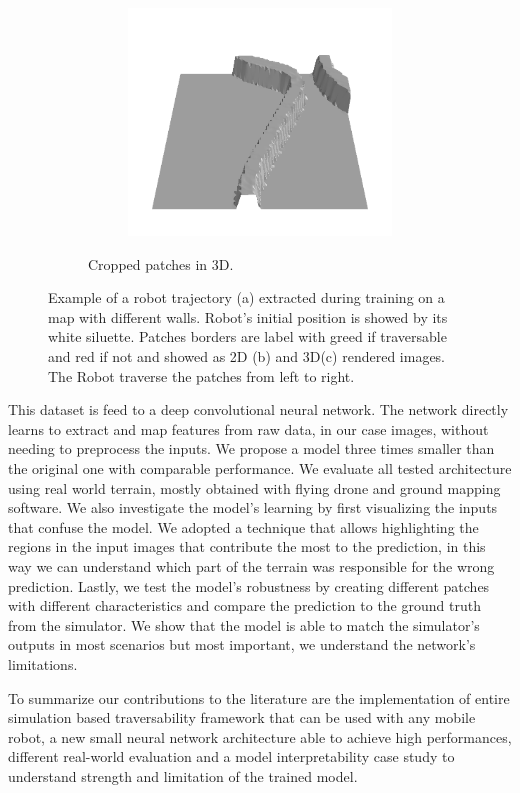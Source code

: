 \documentclass[../document.tex]{subfiles}
\begin{document}
\begin{figure}[H]
\begin{subfigure}[b]{1\textwidth}
\begin{subfigure}[b]{0.19\textwidth}
    \includegraphics[width=\linewidth]{../img/bars1-example-patches/3d/14.png}    
    \end{subfigure}  
\caption{Cropped patches in 3D.}
\label{fig : patch-extraction}
\end{subfigure}
\caption{Example of a robot trajectory (a) extracted during training on a map with different walls. Robot's initial position is showed by its white siluette. Patches borders are label with greed if traversable and red if not and showed as 2D (b) and 3D(c) rendered images. The Robot traverse the patches from left to right.}
\end{figure}

This dataset is feed to a deep convolutional neural network. The network directly learns to extract and map features from raw data, in our case images, without needing to preprocess the inputs. We propose a model three times smaller than the original one with comparable performance. We evaluate all tested architecture using real world terrain, mostly obtained with flying drone and ground mapping software. 
We also investigate the model's learning by first visualizing the inputs that confuse the model. We adopted a technique that allows highlighting the regions in the input images that contribute the most to the prediction, in this way we can understand which part of the terrain was responsible for the wrong prediction. Lastly, we test the model's robustness by creating different patches with different characteristics and compare the prediction to the ground truth from the simulator. We show that the model is able to match the simulator's outputs in most scenarios but most important, we understand the network's limitations.

To summarize our contributions to the literature are the implementation of entire simulation based traversability framework that can be used with any mobile robot, a new small neural network architecture able to achieve high performances, different real-world evaluation and a model interpretability case study to understand strength and limitation of the trained model. 
\end{document}
